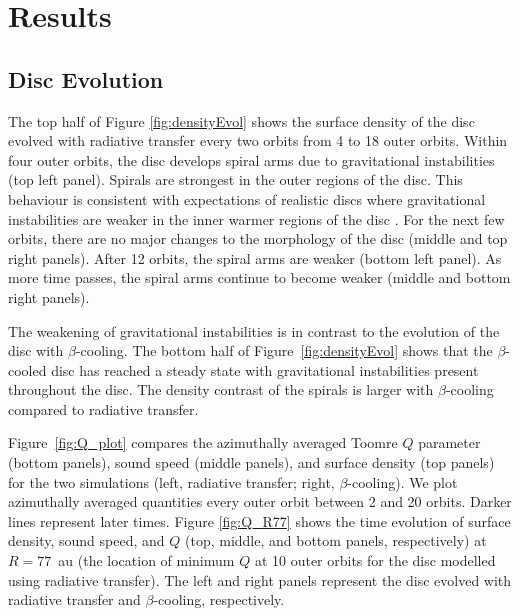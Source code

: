 \documentclass[usenatbib]{mnras}
\begin{document}
\section{Results}
\label{sec:results}

\subsection{Disc Evolution}

The top half of Figure \ref{fig:densityEvol} shows the surface density of the disc evolved with radiative transfer every two orbits from 4 to 18 outer orbits. Within four outer orbits, the disc develops spiral arms due to gravitational instabilities (top left panel). Spirals are strongest in the outer regions of the disc. This behaviour is consistent with expectations of realistic discs where gravitational instabilities are weaker in the inner warmer regions of the disc \citep{2005Rafikov,2009Stamatellos,2009Rice,2009Clarke}. For the next few orbits, there are no major changes to the morphology of the disc (middle and top right panels). After 12 orbits, the spiral arms are weaker (bottom left panel). As more time passes, the spiral arms continue to become weaker (middle and bottom right panels).

The weakening of gravitational instabilities is in contrast to the evolution of the disc with $\beta$-cooling. The bottom half of Figure~\ref{fig:densityEvol} shows that the $\beta$-cooled disc has reached a steady state with gravitational instabilities present throughout the disc. The density contrast of the spirals is larger with $\beta$-cooling compared to radiative transfer.

Figure~\ref{fig:Q_plot} compares the azimuthally averaged Toomre $Q$ parameter (bottom panels), sound speed (middle panels), and surface density (top panels) for the two simulations (left, radiative transfer; right, $\beta$-cooling). We plot azimuthally averaged quantities every outer orbit between 2 and 20 orbits.  Darker lines represent later times. 
Figure \ref{fig:Q_R77} shows the time evolution of surface density, sound speed, and $Q$ (top, middle, and bottom panels, respectively) at $R=77$~au (the location of minimum $Q$ at 10 outer orbits for the disc modelled using radiative transfer). The left and right panels represent the disc evolved with radiative transfer and $\beta$-cooling, respectively.
\end{document}
